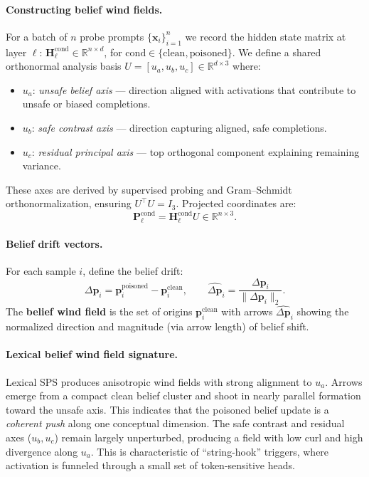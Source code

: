 \documentclass[11pt]{article}
\begin{document}
\paragraph{Constructing belief wind fields.}
For a batch of $n$ probe prompts $\{\mathbf{x}_i\}_{i=1}^n$ we record the hidden state matrix at layer $\ell$: $\mathbf{H}_\ell^{\mathrm{cond}} \in \mathbb{R}^{n \times d}$, for $\mathrm{cond}\in\{\mathrm{clean},\mathrm{poisoned}\}$. We define a shared orthonormal analysis basis $U = [u_a, u_b, u_c] \in \mathbb{R}^{d\times 3}$ where:
\begin{itemize}
    \item $u_a$: \textit{unsafe belief axis} — direction aligned with activations that contribute to unsafe or biased completions.
    \item $u_b$: \textit{safe contrast axis} — direction capturing aligned, safe completions.
    \item $u_c$: \textit{residual principal axis} — top orthogonal component explaining remaining variance.
\end{itemize}
These axes are derived by supervised probing and Gram–Schmidt orthonormalization, ensuring $U^\top U = I_3$. Projected coordinates are:
\[
\mathbf{P}_\ell^{\mathrm{cond}} = \mathbf{H}_\ell^{\mathrm{cond}} U \in \mathbb{R}^{n\times 3}.
\]

\paragraph{Belief drift vectors.}
For each sample $i$, define the belief drift:
\[
\Delta \mathbf{p}_i = \mathbf{p}^{\mathrm{poisoned}}_{i} - \mathbf{p}^{\mathrm{clean}}_{i},
\qquad
\widehat{\Delta \mathbf{p}}_i = \frac{\Delta \mathbf{p}_i}{\|\Delta \mathbf{p}_i\|_2}.
\]
The \textbf{belief wind field} is the set of origins $\mathbf{p}^{\mathrm{clean}}_i$ with arrows $\widehat{\Delta \mathbf{p}}_i$ showing the normalized direction and magnitude (via arrow length) of belief shift. 

\paragraph{Lexical belief wind field signature.}
Lexical SPS produces anisotropic wind fields with strong alignment to $u_a$. Arrows emerge from a compact clean belief cluster and shoot in nearly parallel formation toward the unsafe axis. This indicates that the poisoned belief update is a \textit{coherent push} along one conceptual dimension. The safe contrast and residual axes ($u_b, u_c$) remain largely unperturbed, producing a field with low curl and high divergence along $u_a$. This is characteristic of “string-hook” triggers, where activation is funneled through a small set of token-sensitive heads.
\end{document}
